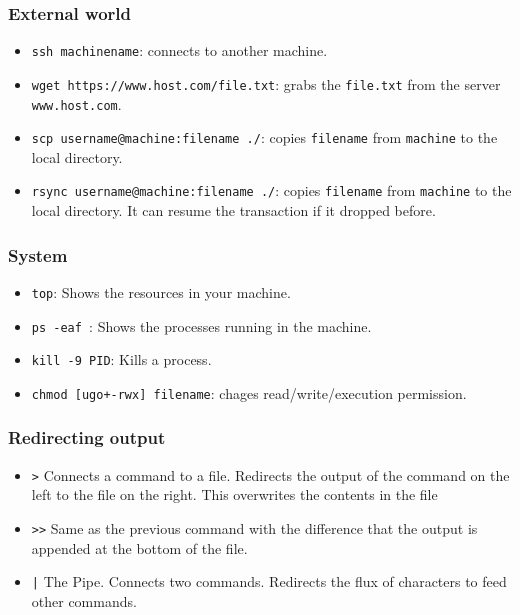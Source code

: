 \documentclass{article}
\begin{document}
\subsubsection*{External world}


\begin{itemize}
\item\verb"ssh machinename": connects to another machine.
\item\verb"wget https://www.host.com/file.txt": grabs the \verb"file.txt" from the server \verb"www.host.com".
\item\verb"scp username@machine:filename ./": copies \verb"filename" from \verb"machine" to the local directory. 
\item\verb"rsync username@machine:filename ./": copies \verb"filename" from \verb"machine" to the local directory. It can resume the transaction if it dropped before.
\end{itemize}


\subsubsection*{System}
\begin{itemize}
\item\verb"top": Shows the resources in your machine. 
\item\verb"ps -eaf ": Shows the processes running in the machine.
\item\verb"kill -9 PID": Kills a process.
\item\verb"chmod [ugo+-rwx] filename": chages read/write/execution permission.
\end{itemize}



\subsubsection*{Redirecting output}
\begin{itemize}
\item\verb">" Connects a command to a file. Redirects the output of the command on the left to the file on the right. This overwrites the contents in the file 
\item\verb">>" Same as the previous command with the difference that the output is appended at the bottom of the file.
\item\verb"|" The Pipe. Connects two commands. Redirects the flux of characters to feed other commands.
\end{itemize}
\end{document}
